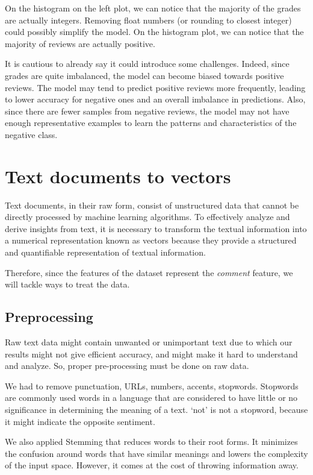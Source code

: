 \documentclass{article}
\begin{document}
On the histogram on the left plot, 
we can notice that the majority of the grades are actually integers. Removing float numbers (or rounding to closest integer) could possibly simplify the model.
On the histogram plot, we can notice that the majority of reviews are actually positive.

It is cautious to already say it could introduce some challenges. Indeed, since grades are quite imbalanced, the model can become biased towards positive reviews. The model may tend to predict positive reviews more frequently, leading to lower accuracy for negative ones and an overall imbalance in predictions. Also, since there are fewer samples from negative reviews, the model may not have enough representative examples to learn the patterns and characteristics of the negative class.

\section{Text documents to vectors}

Text documents, in their raw form, consist of unstructured data that cannot be directly processed by machine learning algorithms. To effectively analyze and derive insights from text, it is necessary to transform the textual information into a numerical representation known as vectors because they provide a structured and quantifiable representation of textual information.

Therefore, since the features of the dataset represent the \textit{comment} feature, we will tackle ways to treat the data.
\subsection{Preprocessing}

Raw text data might contain unwanted or unimportant text due to which our results might not give efficient accuracy, and might make it hard to understand and analyze. So, proper pre-processing must be done on raw data.

We had to remove punctuation, URLs, numbers, accents, stopwords.
Stopwords are commonly used words in a language that are considered to have little or no significance in determining the meaning of a text.
`not' is not a stopword, because it might indicate the opposite sentiment.

We also applied Stemming that reduces words to their root forms. It minimizes the confusion around words that have similar meanings and lowers the complexity of the input space. However, it comes at the cost of throwing information away.
\end{document}

